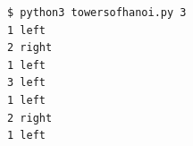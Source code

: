 \documentclass[8pt,a4paper,compress]{beamer}
\begin{document}
\begin{frame}[fragile]
\begin{minipage}{200pt}
\begin{lstlisting}[language={},style=focusin]
$ python3 towersofhanoi.py 3
1 left
2 right
1 left
3 left
1 left
2 right
1 left
\end{lstlisting}
\end{minipage}
\begin{minipage}{100pt}
\end{minipage}
\end{frame}
\end{document}
